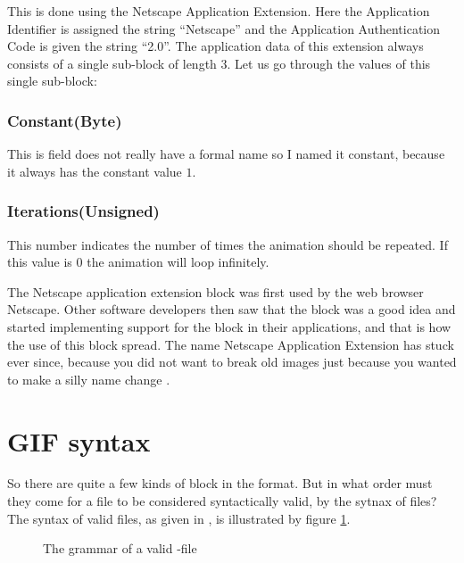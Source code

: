 This is done using the Netscape Application Extension. Here the
Application Identifier is assigned the string ``Netscape'' and the
Application Authentication Code is given the string ``2.0''. The
application data of this extension always consists of a single
sub-block of length 3. Let us go through the values of this single
sub-block: \cite{frazier97:_all_about_gif89}

\subsubsection{Constant(Byte)}

This is field does not really have a formal name so I named it
constant, because it always has the constant value $1$.

\subsubsection{Iterations(Unsigned)}

This number indicates the number of times the animation should be
repeated. If this value is $0$ the animation will loop infinitely.

The Netscape application extension block was first used by the web
browser Netscape. Other software developers then saw that the block
was a good idea and started implementing support for the block in
their applications, and that is how the use of this block spread. The
name Netscape Application Extension has stuck ever since, because you
did not want to break old \gif images just because you wanted to make a silly
name change \cite{walte96:_web_scrip_secret_weapon}.

\section{GIF syntax}
\label{sec:gif-syntax}

So there are quite a few kinds of block in the \gif format. But in what
order must they come for a \gif file to be considered syntactically
valid, by the sytnax of \gif files? The syntax of valid \gif files, as
given in \cite{gif89a}, is illustrated by figure
\ref{fig:gif-grammar}.

\begin{figure}
  \centering


  \caption{The grammar of a valid \gif-file}
  \label{fig:gif-grammar}
\end{figure}

